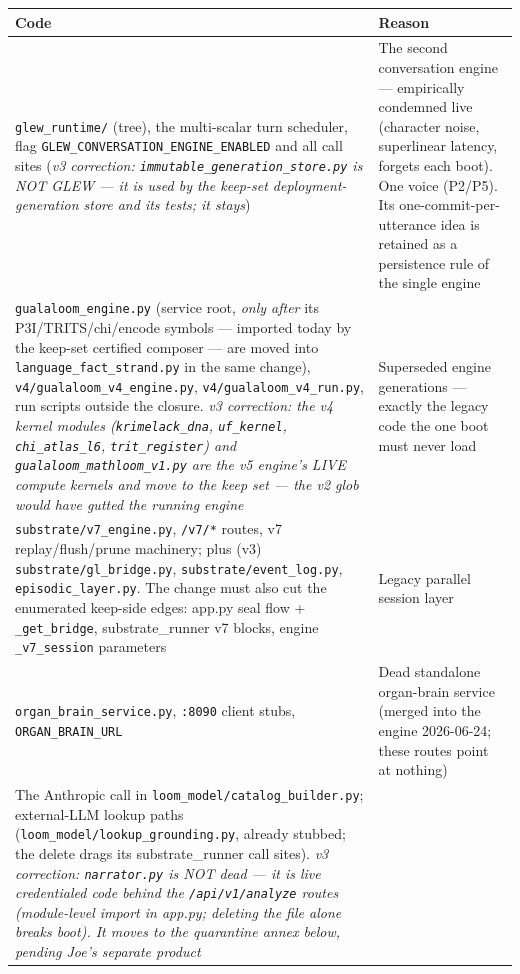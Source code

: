 \documentclass[11pt]{article}
\begin{document}
\begin{longtable}{p{} p{}}
\toprule
\textbf{Code} & \textbf{Reason} \\
\midrule
\texttt{glew\_runtime/} (tree), the multi-scalar turn scheduler, flag
\texttt{GLEW\_CONVERSATION\_ENGINE\_ENABLED} and all call sites
(\emph{v3 correction: \texttt{immutable\_generation\_store.py} is NOT
GLEW — it is used by the keep-set deployment-generation store and its
tests; it stays}) &
The second conversation engine — empirically condemned live (character
noise, superlinear latency, forgets each boot). One voice (P2/P5). Its
one-commit-per-utterance idea is retained as a persistence rule of the
single engine \\
\texttt{gualaloom\_engine.py} (service root, \emph{only after} its
P3I/TRITS/chi/encode symbols — imported today by the keep-set certified
composer — are moved into \texttt{language\_fact\_strand.py} in the same
change), \texttt{v4/gualaloom\_v4\_engine.py},
\texttt{v4/gualaloom\_v4\_run.py}, run scripts outside the closure.
\emph{v3 correction: the v4 kernel modules
(\texttt{krimelack\_dna}, \texttt{uf\_kernel}, \texttt{chi\_atlas\_l6},
\texttt{trit\_register}) and \texttt{gualaloom\_mathloom\_v1.py} are the
v5 engine's LIVE compute kernels and move to the keep set — the v2 glob
would have gutted the running engine} &
Superseded engine generations — exactly the legacy code the one boot must
never load \\
\texttt{substrate/v7\_engine.py}, \texttt{/v7/*} routes, v7
replay/flush/prune machinery; plus (v3) \texttt{substrate/gl\_bridge.py},
\texttt{substrate/event\_log.py}, \texttt{episodic\_layer.py}. The change
must also cut the enumerated keep-side edges: app.py seal flow +
\texttt{\_get\_bridge}, substrate\_runner v7 blocks, engine
\texttt{\_v7\_session} parameters &
Legacy parallel session layer \\
\texttt{organ\_brain\_service.py}, \texttt{:8090} client stubs,
\texttt{ORGAN\_BRAIN\_URL} &
Dead standalone organ-brain service (merged into the engine 2026-06-24;
these routes point at nothing) \\
The Anthropic call in \texttt{loom\_model/catalog\_builder.py};
external-LLM lookup paths (\texttt{loom\_model/lookup\_grounding.py},
already stubbed; the delete drags its substrate\_runner call sites).
\emph{v3 correction: \texttt{narrator.py} is NOT dead — it is live
credentialed code behind the \texttt{/api/v1/analyze} routes
(module-level import in app.py; deleting the file alone breaks boot).
It moves to the quarantine annex below, pending Joe's separate product
}
\end{longtable}
\end{document}
